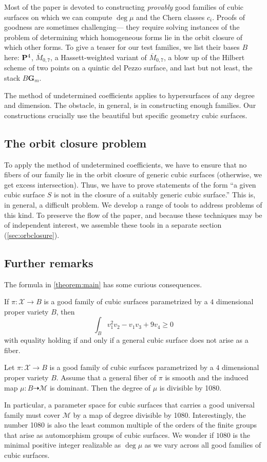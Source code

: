 \documentclass[11pt,reqno, letterpaper]{amsart}
\renewcommand{\to}{{\longrightarrow}}
\numberwithin{equation}{section}
\newcommand{\G}{\mathbf G}
\newcommand{\cX}{\mathcal{X}}
\begin{document}
Most of the paper is devoted to constructing {\sl provably} good
families of cubic surfaces on which we can compute $\deg \mu$ and the
Chern classes $c_i$.  Proofs of goodness are sometimes challenging---
they require solving instances of the problem of determining which
homogeneous forms lie in the orbit closure of which other forms.
To give a teaser for our test families, we list their
bases $B$ here: $\P^4$, $\overline M_{0,7}$, a
Hassett-weighted variant of $\overline M_{0,7}$, a blow up of the
Hilbert scheme of two points on a quintic del Pezzo surface, and last
but not least, the stack $B\G_m$.

The method of undetermined coefficients applies to hypersurfaces of
any degree and dimension.  The obstacle, in general, is in
constructing enough families.  Our constructions crucially use the
beautiful but specific geometry cubic surfaces.

\subsection{The orbit closure problem}
To apply the method of undetermined coefficients, we have to ensure that no fibers of our family lie in the orbit closure of generic cubic surfaces (otherwise, we get excess intersection).
Thus, we have to prove statements of the form ``a given cubic surface $S$ is not in the closure of a suitably generic cubic surface.''
This is, in general, a difficult problem.
We develop a range of tools to address problems of this kind.
To preserve the flow of the paper, and because these techniques may be of independent interest, we assemble these tools in a separate section (\autoref{sec:orbclosure}).

\subsection{Further remarks}
The formula in \autoref{theorem:main} has some curious consequences.
\begin{corollary}
  \label{cor:ineq} If $\pi \colon \cX \to B$ is a good family of cubic
  surfaces parametrized by a $4$ dimensional proper variety $B$,
  then
  \[\int_{B} v_{1}^{2}v_{2} - v_{1}v_3 + 9v_{4} \geq 0\]
  with
  equality holding if and only if a general cubic surface does not
  arise as a fiber.
\end{corollary}

\begin{corollary}
  \label{cor:div} Let $\pi \colon \cX \to B$ is a good family of cubic
  surfaces parametrized by a $4$ dimensional proper variety $B$.
  Assume that a general fiber of $\pi$ is smooth and the induced map
  $\mu \colon B \dashrightarrow \mathcal M$ is dominant.
  Then the degree of $\mu$ is divisible by 1080.
\end{corollary}
In particular, a parameter space for cubic surfaces that carries a
good universal family must cover $\mathcal M$ by a map of degree
divisible by 1080.  Interestingly, the number 1080 is also the least
common multiple of the orders of the finite groups that arise as
automorphism groups of cubic surfaces.
We wonder if $1080$ is the minimal positive integer realizable as $\deg \mu$ as we vary
across all good families of cubic surfaces.
\end{document}
